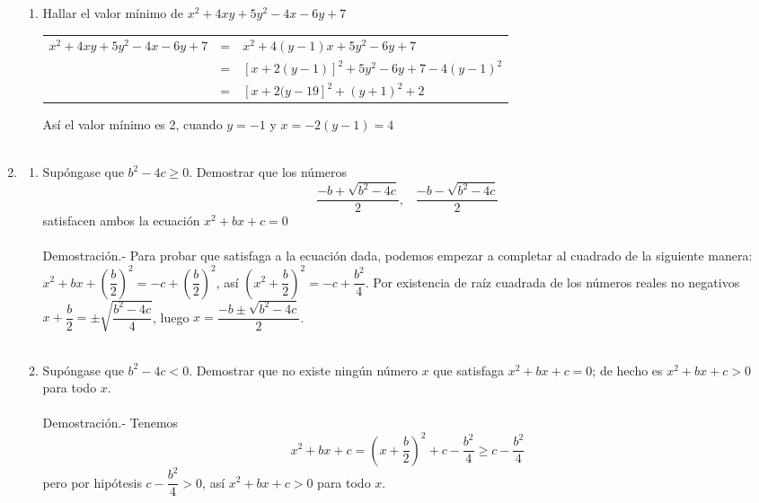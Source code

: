 \begin{enumerate}[\bfseries 1.]
\begin{enumerate}[\bfseries (a)]
\item Hallar el valor mínimo de $x^2+4xy+5y^2-4x-6y+7$\\
\begin{center}
\begin{tabular}{r c l}
$x^2+4xy+5y^2-4x-6y+7$&=&$x^2+4(y-1)x+5y^2-6y+7$\\
&=&$[x+2(y-1)]^2+5y^2-6y+7-4(y-1)^2$\\
&=&$[x+2(y-19]^2+(y+1)^2+2$\\
\end{tabular}
\end{center}
Así el valor mínimo es 2, cuando $y=-1$ y $x=-2(y-1)=4$\\\\
\end{enumerate}

\item
\begin{enumerate}[\bfseries (a)]
\item Supóngase que $b^2-4c\geq 0$. Demostrar que los números
$$\dfrac{-b+\sqrt{b^2-4c}}{2}, \; \; \; \dfrac{-b- \sqrt{b^2-4c}}{2}$$
satisfacen ambos la ecuación $x^2+bx+c	=0$\\\\
Demostración.- \; Para probar que satisfaga a la ecuación dada, podemos empezar a completar al cuadrado de la siguiente manera: $x^2+bx+\left(\dfrac{b}{2}\right)^2=-c+\left(\dfrac{b}{2}\right)^2$, así $\left( x^2+\dfrac{b}{2} \right)^2=-c+\dfrac{b^2}{4}$. Por existencia de raíz cuadrada de los números reales no negativos $x+\dfrac{b}{2} = \pm \sqrt{\dfrac{b^2-4c}{4}}$, luego $x=\dfrac{-b \pm \sqrt{b^2-4c}}{2}$.\\\\ 

\item Supóngase que $b^2-4c<0$. Demostrar que no existe ningún número $x$ que satisfaga $x^2+bx+c=0$; de hecho es $x^2+bx+c>0$ para todo $x$.\\\\
Demostración.- \: Tenemos $$x^2+bx+c=\left( x+\dfrac{b}{2}\right)^2+c-\dfrac{b^2}{4}\geq c- \dfrac{b^2}{4}$$ pero por hipótesis $c-\dfrac{b^2}{4}>0$, así $x^2+bx+c>0$ para todo $x$. \\\\


\end{enumerate}
\end{enumerate}
